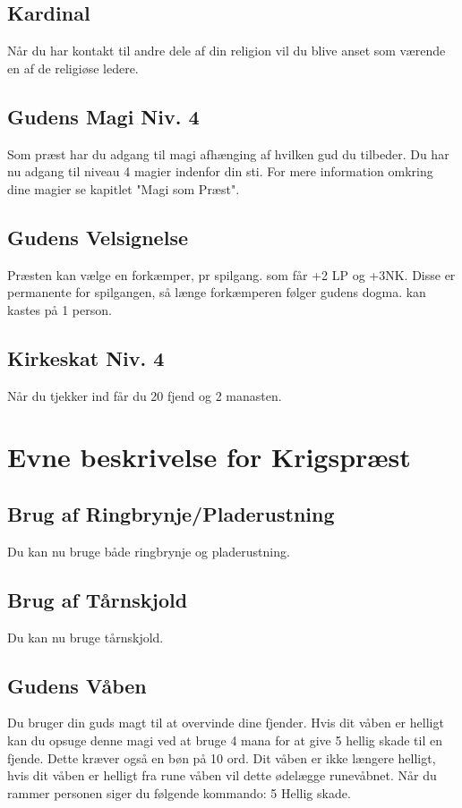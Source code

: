 

\subsection{Kardinal}
Når du har kontakt til andre dele af din religion vil du blive anset som værende en af de religiøse ledere.

\subsection{Gudens Magi Niv. 4}
Som præst har du adgang til magi afhænging af hvilken gud du tilbeder. Du har nu adgang til niveau 4 magier indenfor din sti. For mere information omkring dine magier se kapitlet "Magi som Præst".

\subsection{Gudens Velsignelse}
Præsten kan vælge en forkæmper, pr spilgang. som får +2 LP og +3NK. Disse er permanente for spilgangen, så længe forkæmperen følger gudens dogma. kan kastes på 1 person.

\subsection{Kirkeskat Niv. 4}
Når du tjekker ind får du 20 fjend og 2 manasten.


\section{Evne beskrivelse for Krigspræst}

\subsection{Brug af Ringbrynje/Pladerustning}
Du kan nu bruge både ringbrynje og pladerustning. 

\subsection{Brug af Tårnskjold}
Du kan nu bruge tårnskjold.





\subsection{Gudens Våben}
Du bruger din guds magt til at overvinde dine fjender. Hvis dit våben er helligt kan du opsuge denne magi ved at bruge 4 mana for at give 5 hellig skade til en fjende. Dette kræver også en bøn på 10 ord. Dit våben er ikke længere helligt, hvis dit våben er helligt fra rune våben vil dette ødelægge runevåbnet. Når du rammer personen siger du følgende kommando: 5 Hellig skade.

